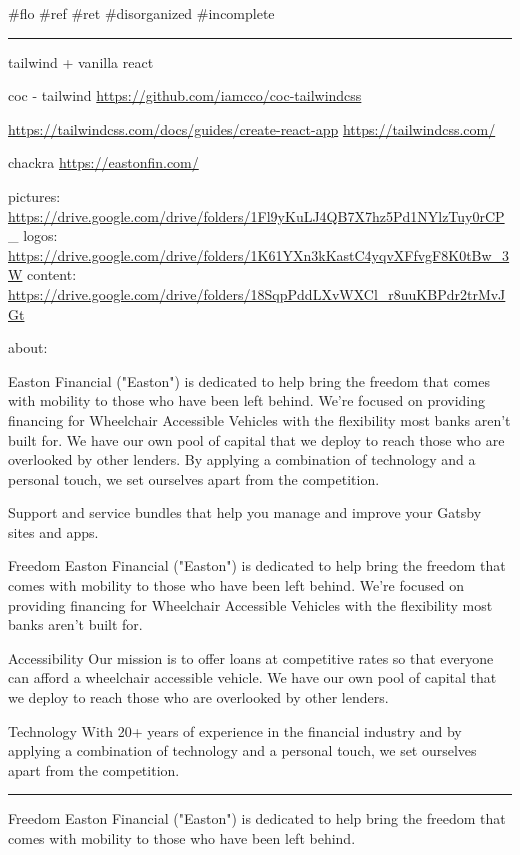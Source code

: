 \documentclass[letterpaper]{article}
\date{\today}
\title{}
\renewcommand{\tableofcontents}{}
\begin{document}
\tableofcontents

\#flo \#ref \#ret \#disorganized \#incomplete

\noindent\rule{\textwidth}{0.5pt}

tailwind + vanilla react

coc - tailwind \url{https://github.com/iamcco/coc-tailwindcss}

\url{https://tailwindcss.com/docs/guides/create-react-app}
\url{https://tailwindcss.com/}

chackra \url{https://eastonfin.com/}

pictures:
\url{https://drive.google.com/drive/folders/1Fl9yKuLJ4QB7X7hz5Pd1NYlzTuy0rCP}\_
logos:
\url{https://drive.google.com/drive/folders/1K61YXn3kKastC4yqvXFfvgF8K0tBw\_3W}
content:
\url{https://drive.google.com/drive/folders/18SqpPddLXvWXCl\_r8uuKBPdr2trMvJGt}

about:

Easton Financial ("Easton") is dedicated to help bring the freedom that
comes with mobility to those who have been left behind. We're focused on
providing financing for Wheelchair Accessible Vehicles with the
flexibility most banks aren't built for. We have our own pool of capital
that we deploy to reach those who are overlooked by other lenders. By
applying a combination of technology and a personal touch, we set
ourselves apart from the competition.

Support and service bundles that help you manage and improve your Gatsby
sites and apps.

Freedom Easton Financial ("Easton") is dedicated to help bring the
freedom that comes with mobility to those who have been left behind.
We're focused on providing financing for Wheelchair Accessible Vehicles
with the flexibility most banks aren't built for.

Accessibility Our mission is to offer loans at competitive rates so that
everyone can afford a wheelchair accessible vehicle. We have our own
pool of capital that we deploy to reach those who are overlooked by
other lenders.

Technology With 20+ years of experience in the financial industry and by
applying a combination of technology and a personal touch, we set
ourselves apart from the competition.

\noindent\rule{\textwidth}{0.5pt}

Freedom Easton Financial ("Easton") is dedicated to help bring the
freedom that comes with mobility to those who have been left behind.
\end{document}
